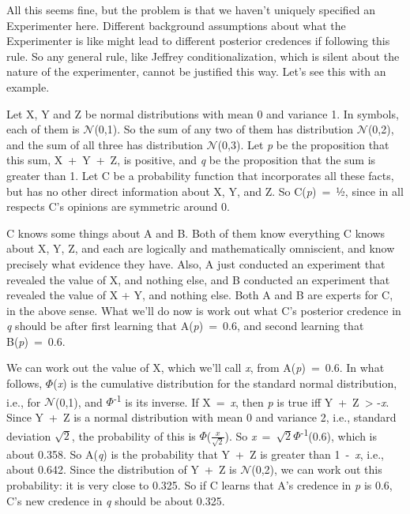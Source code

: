 \documentclass[
  11pt,
  letterpaper,
  DIV=11,
  numbers=noendperiod,
  twoside]{scrartcl}
\begin{document}
All this seems fine, but the problem is that we haven't uniquely
specified an Experimenter here. Different background assumptions about
what the Experimenter is like might lead to different posterior
credences if following this rule. So any general rule, like Jeffrey
conditionalization, which is silent about the nature of the
experimenter, cannot be justified this way. Let's see this with an
example.

Let X, Y and Z be normal distributions with mean 0 and variance 1. In
symbols, each of them is \(\mathcal{N}\)(0,1). So the sum of any two of
them has distribution \(\mathcal{N}\)(0,2), and the sum of all three has
distribution \(\mathcal{N}\)(0,3). Let \emph{p} be the proposition that
this sum, X~+~Y~+~Z, is positive, and \emph{q} be the proposition that
the sum is greater than 1. Let C be a probability function that
incorporates all these facts, but has no other direct information about
X, Y, and Z. So C(\emph{p})~=~½, since in all respects C's opinions are
symmetric around 0.

C knows some things about A and B. Both of them know everything C knows
about X, Y, Z, and each are logically and mathematically omniscient, and
know precisely what evidence they have. Also, A just conducted an
experiment that revealed the value of X, and nothing else, and B
conducted an experiment that revealed the value of X + Y, and nothing
else. Both A and B are experts for C, in the above sense. What we'll do
now is work out what C's posterior credence in \emph{q} should be after
first learning that A(\emph{p})~=~0.6, and second learning that
B(\emph{p})~=~0.6.

We can work out the value of X, which we'll call \emph{x}, from
A(\emph{p})~=~0.6. In what follows, \(\Phi\)(\emph{x}) is the cumulative
distribution for the standard normal distribution, i.e., for
\(\mathcal{N}\)(0,1), and \(\Phi\)\textsuperscript{-1} is its inverse.
If X~=~\emph{x}, then \emph{p} is true iff Y~+~Z~\textgreater{}
-\emph{x}. Since Y~+~Z is a normal distribution with mean 0 and variance
2, i.e., standard deviation \(\sqrt{2}\), the probability of this is
\(\Phi\)(\(\frac{x}{\sqrt{2}}\)). So
\emph{x}~=~\(\sqrt{2}\Phi\)\textsuperscript{-1}(0.6), which is about
0.358. So A(\emph{q}) is the probability that Y~+~Z is greater than
1~-~\emph{x}, i.e., about 0.642. Since the distribution of Y~+~Z is
\(\mathcal{N}\)(0,2), we can work out this probability: it is very close
to 0.325. So if C learns that A's credence in \emph{p} is 0.6, C's new
credence in \emph{q} should be about 0.325.
\end{document}
